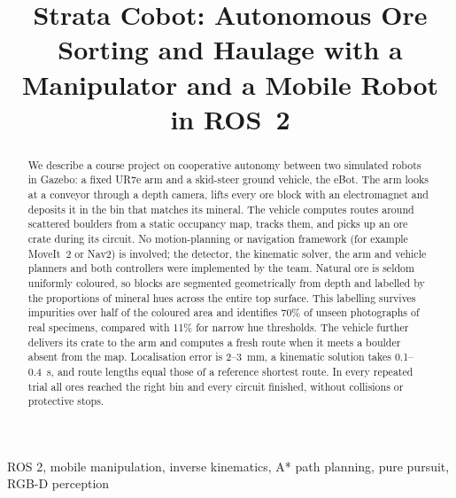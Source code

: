 \documentclass[conference]{IEEEtran}
\begin{document}
\title{Strata Cobot: Autonomous Ore Sorting and Haulage with a Manipulator and a Mobile Robot in ROS~2}

\author{
\and
{}
\and
{}
}

\maketitle

\begin{abstract}
We describe a course project on cooperative autonomy between two simulated robots in Gazebo: a fixed UR7e arm and a skid-steer ground vehicle, the eBot. The arm looks at a conveyor through a depth camera, lifts every ore block with an electromagnet and deposits it in the bin that matches its mineral. The vehicle computes routes around scattered boulders from a static occupancy map, tracks them, and picks up an ore crate during its circuit. No motion-planning or navigation framework (for example MoveIt~2 or Nav2) is involved; the detector, the kinematic solver, the arm and vehicle planners and both controllers were implemented by the team. Natural ore is seldom uniformly coloured, so blocks are segmented geometrically from depth and labelled by the proportions of mineral hues across the entire top surface. This labelling survives impurities over half of the coloured area and identifies 70\% of unseen photographs of real specimens, compared with 11\% for narrow hue thresholds. The vehicle further delivers its crate to the arm and computes a fresh route when it meets a boulder absent from the map. Localisation error is 2--3~mm, a kinematic solution takes 0.1--0.4~s, and route lengths equal those of a reference shortest route. In every repeated trial all ores reached the right bin and every circuit finished, without collisions or protective stops.
\end{abstract}

\begin{IEEEkeywords}
ROS 2, mobile manipulation, inverse kinematics, A* path planning, pure pursuit, RGB-D perception
\end{IEEEkeywords}
\end{document}
